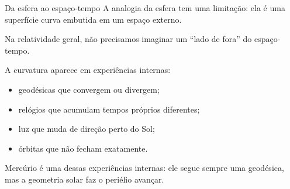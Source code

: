 \documentclass[aspectratio=169,10pt]{beamer}
\begin{document}
\begin{frame}{Da esfera ao espaço-tempo}
  A analogia da esfera tem uma limitação: ela é uma superfície curva embutida em um espaço externo.

  \vspace{0.25cm}
  Na relatividade geral, não precisamos imaginar um ``lado de fora'' do espaço-tempo.

  \vspace{0.25cm}
  A curvatura aparece em experiências internas:
  \begin{itemize}
    \item geodésicas que convergem ou divergem;
    \item relógios que acumulam tempos próprios diferentes;
    \item luz que muda de direção perto do Sol;
    \item órbitas que não fecham exatamente.
  \end{itemize}

  \vspace{0.3cm}
  Mercúrio é uma dessas experiências internas: ele segue sempre uma geodésica, mas a geometria solar faz o periélio avançar.
\end{frame}
\end{document}
